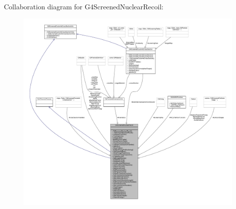 Collaboration diagram for G4\+Screened\+Nuclear\+Recoil\+:
\nopagebreak
\begin{figure}[H]
\begin{center}
\leavevmode
\includegraphics[width=350pt]{classG4ScreenedNuclearRecoil__coll__graph}
\end{center}
\end{figure}
